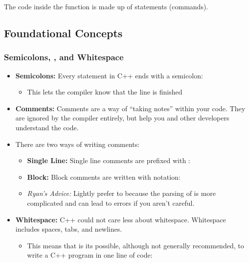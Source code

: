 \documentclass{article}
\begin{document}
\noindent
The code inside the  function is made up of statements (commands).

\subsection{Foundational Concepts}

\subsubsection{Semicolons, , and Whitespace}

\begin{itemize}
	\item \textbf{Semicolons:} Every statement in C++ ends with a semicolon:
	\begin{itemize}
		\item This lets the compiler know that the line is finished
	\end{itemize}
	\item \textbf{Comments:} Comments are a way of ``taking notes'' within your code. They are ignored by the compiler entirely, but help you and other developers understand the code.
	\item There are two ways of writing comments:
	\begin{itemize}
		\item \textbf{Single Line:} Single line comments are prefixed with \inlinecpp{//}:
		\item \textbf{Block:} Block comments are written with \inlinecpp{/* */} notation:
		\item \textsl{Ryan's Advice:} Lightly prefer \inlinecpp{//} to \inlinecpp{/* */} because the parsing of \inlinecpp{/* */} is more complicated and can lead to errors if you aren't careful.
	\end{itemize}
	\item \textbf{Whitespace:} C++ could not care less about whitespace. Whitespace includes spaces, tabs, and newlines.
	\begin{itemize}
		\item This means that is its possible, although not generally recommended, to write a C++ program in one line of code:
	\end{itemize}
\end{itemize}
\end{document}
